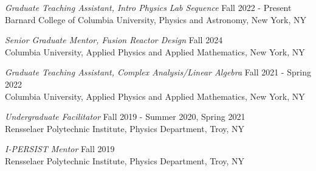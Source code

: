 \documentclass{rpires}
\begin{document}
\begin{resume}
    \textit{Graduate Teaching Assistant, Intro Physics Lab Sequence} \hfill Fall 2022 - Present \\
    Barnard College of Columbia University, Physics and Astronomy, New York, NY
    \vspace{-0.08cm}
    
    \textit{Senior Graduate Mentor, Fusion Reactor Design} \hfill Fall 2024 \\
    Columbia University, Applied Physics and Applied Mathematics, New York, NY
    \vspace{-0.08cm}

    \textit{Graduate Teaching Assistant, Complex Analysis/Linear Algebra} \hfill Fall 2021 - Spring 2022 \\
    Columbia University, Applied Physics and Applied Mathematics, New York, NY
    \vspace{-0.08cm}

    \textit{Undergraduate Facilitator} \hfill Fall 2019 - Summer 2020, Spring 2021 \\
    Rensselaer Polytechnic Institute, Physics Department, Troy, NY
    \vspace{-0.08cm}

    \textit{I-PERSIST Mentor} \hfill Fall 2019 \\
    Rensselaer Polytechnic Institute, Physics Department, Troy, NY
    \vspace{-0.08cm}


\end{resume}
\end{document}

